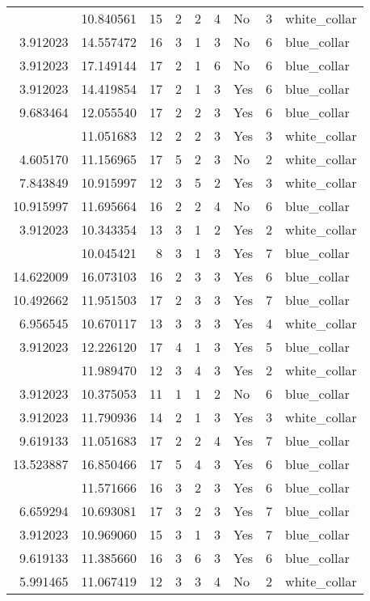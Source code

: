 \documentclass[
]{article}
\begin{document}
\begin{longtable}[t]{rrrrrllrl}
\addlinespace
6.745236 & 10.840561 & 15 & 2 & 2 & 4 & No & 3 & white\_collar\\
3.912023 & 14.557472 & 16 & 3 & 1 & 3 & No & 6 & blue\_collar\\
3.912023 & 17.149144 & 17 & 2 & 1 & 6 & No & 6 & blue\_collar\\
3.912023 & 14.419854 & 17 & 2 & 1 & 3 & Yes & 6 & blue\_collar\\
9.683464 & 12.055540 & 17 & 2 & 2 & 3 & Yes & 6 & blue\_collar\\
\addlinespace
9.619133 & 11.051683 & 12 & 2 & 2 & 3 & Yes & 3 & white\_collar\\
4.605170 & 11.156965 & 17 & 5 & 2 & 3 & No & 2 & white\_collar\\
7.843849 & 10.915997 & 12 & 3 & 5 & 2 & Yes & 3 & white\_collar\\
10.915997 & 11.695664 & 16 & 2 & 2 & 4 & No & 6 & blue\_collar\\
3.912023 & 10.343354 & 13 & 3 & 1 & 2 & Yes & 2 & white\_collar\\
\addlinespace
3.912023 & 10.045421 & 8 & 3 & 1 & 3 & Yes & 7 & blue\_collar\\
14.622009 & 16.073103 & 16 & 2 & 3 & 3 & Yes & 6 & blue\_collar\\
10.492662 & 11.951503 & 17 & 2 & 3 & 3 & Yes & 7 & blue\_collar\\
6.956545 & 10.670117 & 13 & 3 & 3 & 3 & Yes & 4 & white\_collar\\
3.912023 & 12.226120 & 17 & 4 & 1 & 3 & Yes & 5 & blue\_collar\\
\addlinespace
8.860783 & 11.989470 & 12 & 3 & 4 & 3 & Yes & 2 & white\_collar\\
3.912023 & 10.375053 & 11 & 1 & 1 & 2 & No & 6 & blue\_collar\\
3.912023 & 11.790936 & 14 & 2 & 1 & 3 & Yes & 3 & white\_collar\\
9.619133 & 11.051683 & 17 & 2 & 2 & 4 & Yes & 7 & blue\_collar\\
13.523887 & 16.850466 & 17 & 5 & 4 & 3 & Yes & 6 & blue\_collar\\
\addlinespace
6.309918 & 11.571666 & 16 & 3 & 2 & 3 & Yes & 6 & blue\_collar\\
6.659294 & 10.693081 & 17 & 3 & 2 & 3 & Yes & 7 & blue\_collar\\
3.912023 & 10.969060 & 15 & 3 & 1 & 3 & Yes & 7 & blue\_collar\\
9.619133 & 11.385660 & 16 & 3 & 6 & 3 & Yes & 6 & blue\_collar\\
5.991465 & 11.067419 & 12 & 3 & 3 & 4 & No & 2 & white\_collar\\

\end{longtable}
\end{document}

